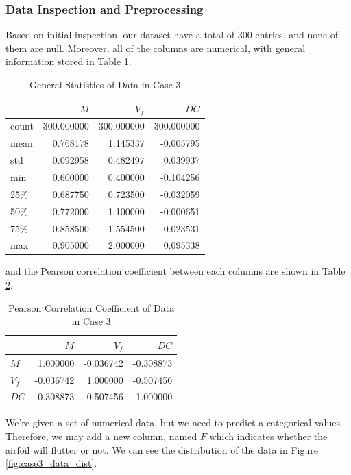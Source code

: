 \documentclass[conf]{new-aiaa}
\begin{document}
\subsubsection{Data Inspection and Preprocessing}
Based on initial inspection, our dataset have a total of 300 entries, and none of them are null. Moreover, all of the columns are numerical, with general information stored in Table \ref{tab:case3_data_info}. 
\begin{table}
    \centering
    \caption{ \label{tab:case3_data_info}General Statistics of Data in Case 3}
    \begin{tabular}{lrrr} 
        \toprule
        {} &           $M$ &          $V_f$ &          $DC$ \\
        \midrule
        count &  300.000000 &  300.000000 &  300.000000 \\
        mean  &    0.768178 &    1.145337 &   -0.005795 \\
        std   &    0.092958 &    0.482497 &    0.039937 \\
        min   &    0.600000 &    0.400000 &   -0.104256 \\
        25\%   &    0.687750 &    0.723500 &   -0.032059 \\
        50\%   &    0.772000 &    1.100000 &   -0.000651 \\
        75\%   &    0.858500 &    1.554500 &    0.023531 \\
        max   &    0.905000 &    2.000000 &    0.095338 \\
        \bottomrule
    \end{tabular}
\end{table}
and the Pearson correlation coefficient between each columns are shown in Table \ref{tab:case3_corr_heatmap}.
\begin{table}
    \centering
    \caption{ \label{tab:case3_corr_heatmap}Pearson Correlation Coefficient of Data in Case 3}
    \begin{tabular}{lrrr} 
        \toprule
        {} &           $M$ &          $V_f$ &          $DC$ \\
        \midrule
        $M$ &  1.000000 &  -0.036742 & -0.308873 \\
        $V_f$ &  -0.036742 &  1.000000 & -0.507456 \\
        $DC$ & -0.308873 & -0.507456 &  1.000000 \\
        \bottomrule
    \end{tabular}
\end{table}
We're given a set of numerical data, but we need to predict a categorical values. Therefore, we may add a new column, named $F$ which indicates whether the airfoil will flutter or not. We can see the distribution of the data in Figure \ref{fig:case3_data_dist}.
\end{document}
